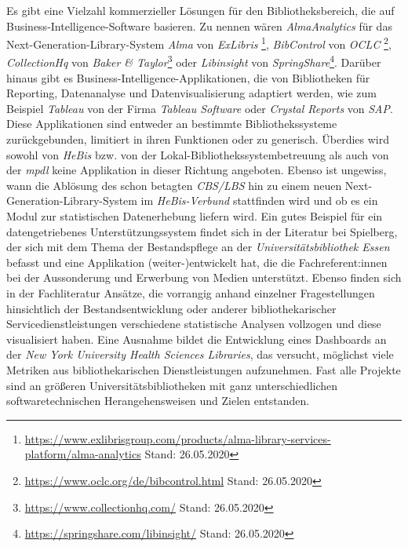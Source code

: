 Es gibt eine Vielzahl kommerzieller Lösungen für den Bibliotheksbereich, die auf Business-Intelligence-Software basieren.
Zu nennen wären \textit{AlmaAnalytics} für das Next-Generation-Library-System \textit{Alma} von \textit{ExLibris}
\footnote{\url{https://www.exlibrisgroup.com/products/alma-library-services-platform/alma-analytics} Stand: 26.05.2020}, \textit{BibControl} von \textit{OCLC} \footnote{\url{https://www.oclc.org/de/bibcontrol.html} 
Stand: 26.05.2020}, 
\textit{CollectionHq} von \textit{Baker \& Taylor}\footnote{\url{https://www.collectionhq.com/} 
Stand: 26.05.2020} oder \textit{Libinsight} von \textit{SpringShare}\footnote{\url{https://springshare.com/libinsight/} Stand: 26.05.2020}.
Darüber hinaus gibt es Business-Intelligence-Applikationen, die von
Bibliotheken für Reporting, Datenanalyse und Datenvisualisierung adaptiert werden,
wie zum Beispiel \textit{Tableau} von der Firma \textit{Tableau Software} oder
\textit{Crystal Reports} von \textit{SAP}.
Diese Applikationen sind entweder
an bestimmte Bibliothekssysteme zurückgebunden, limitiert in ihren
Funktionen\cite{golas_statistische_2018} oder zu generisch.
Überdies wird sowohl von \textit{HeBis} bzw. von der
Lokal-Bibliothekssystembetreuung als auch von der \textit{mpdl} keine Applikation
in dieser Richtung angeboten.
Ebenso ist ungewiss, wann die Ablösung des schon betagten \textit{CBS/LBS} hin zu
einem neuen Next-Generation-Library-System im \textit{HeBis-Verbund} stattfinden wird und ob
es ein Modul zur statistischen Datenerhebung liefern wird.
Ein gutes Beispiel für ein datengetriebenes Unterstützungssystem findet sich in
der Literatur bei Spielberg, der sich mit dem Thema der Bestandspflege an der
\textit{Universitätsbibliothek Essen} befasst und eine Applikation (weiter-)entwickelt hat, die
die Fachreferent:innen bei der Aussonderung und Erwerbung von Medien
unterstützt.\cite{spielberg_eike_t_fachref-assistent_nodate}
Ebenso finden sich in der Fachliteratur Ansätze, die vorrangig anhand einzelner
Fragestellungen hinsichtlich der Bestandsentwicklung\cite{hughes_long-term_2016} oder anderer
bibliothekarischer Servicedienstleistungen\cite{kutlay_shiny_2020, knievel_use_2006,meyer_using_2018} verschiedene statistische Analysen
vollzogen und diese visualisiert haben.
Eine Ausnahme bildet die Entwicklung eines Dashboards an der \textit{New York
University Health Sciences Libraries}, das versucht, möglichst viele Metriken
aus bibliothekarischen Dienstleistungen aufzunehmen.\cite{morton-owens_trends_2012}
Fast alle Projekte sind an größeren
Universitätsbibliotheken mit ganz unterschiedlichen softwaretechnischen
Herangehensweisen\cite{finch_using_2016, wiegand_visualizing_2013} und Zielen\cite{phetteplace_effectively_2012} entstanden.

